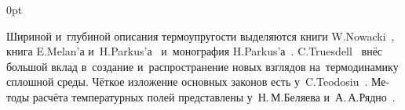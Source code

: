 \begin{changemargin}{\parindent}{0pt}
\fontsize{10}{12}\selectfont

\begin{otherlanguage}{russian}

Шириной и~глубиной
описания термоупругости
выделяются книги
\hbox{W\hspace{-0.2ex}.\:Nowacki}~\cite{nowacki-problemsofthermoelasticity, nowacki-elasticity},
книга E.\:Melan’а и~H.\:Parkus’а~\cite{parkus.melan-waermespannungen}
и~моно\-графия H.\:Parkus’а~\cite{parkus-waermespannungen}.
C.\:Truesdell~\cite{truesdell-firstcourse}
внёс большой вклад
в~создание
и~распространение
новых взглядов
на~термодинамику
сплошной среды.
Чёткое
изложение основных законов
есть у~C.\:Teodosiu~\cite{teodosiu-crystaldefects}.
Методы расчёта
температурных полей
представлены
у~Н.\,М.\;Беляева и~А.\,А.\;Рядно~\cite{belyaev.ryadno}.

\end{otherlanguage}

\end{changemargin}
